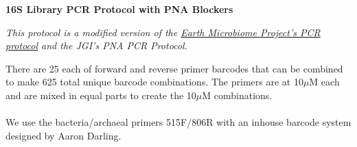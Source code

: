 \documentclass[11pt]{article}
\begin{document}
\begin{center}
\textbf{\large{16S Library PCR Protocol with PNA Blockers}}
\break

\emph{This protocol is a modified version of the \href{http://www.earthmicrobiome.org/emp-standard-protocols/16s/}{Earth Microbiome Project's PCR protocol} and the JGI's PNA PCR Protocol.}
\end{center}

There are 25 each of forward and reverse primer barcodes that can be combined to make 625 total unique barcode combinations. The primers are at 10$\mu$M each and are mixed in equal parts to create the 10$\mu$M combinations. \\
\hfill
\\
We use the bacteria/archaeal primers 515F/806R with an inhouse barcode system designed by Aaron Darling. \\

\\
\\
\end{document}
